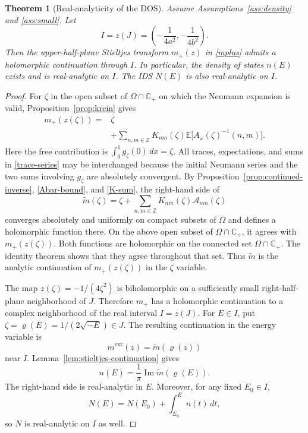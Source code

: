 \documentclass[12pt,a4paper]{article}
\numberwithin{equation}{section}
\newcommand{\E}{\mathbb E}
\newcommand{\C}{\mathbb C}
\newcommand{\Z}{\mathbb Z}
\newcommand{\cA}{\mathcal A}
\newcommand{\Om}{\Omega}
\renewcommand{\Im}{\operatorname{Im}}
\newtheorem{thm}{Theorem}
\begin{document}
\begin{thm}[Real-analyticity of the DOS]\label{thm:main}
Assume Assumptions~\ref{ass:density} and \ref{ass:small}.  Let
\begin{equation}
I=z(J)
 =\left(-\frac{1}{4a^2},-\frac{1}{4b^2}\right).
\label{energy-I}
\end{equation}
Then the upper-half-plane Stieltjes transform $m_+(z)$ in \eqref{mplus}
admits a holomorphic continuation through $I$.  In particular, the density
of states $n(E)$ exists and is real-analytic on $I$.  The IDS $N(E)$ is also
real-analytic on $I$.
\end{thm}

\begin{proof}
For $\zeta$ in the open subset of $\Om\cap\C_+$ on which the Neumann
expansion is valid, Proposition~\ref{prop:krein} gives
\begin{equation}
\begin{split}
m_+(z(\zeta))
={}&\zeta\\
&+\sum_{n,m\in\Z}K_{nm}(\zeta)
\E\bigl[A_\omega(\zeta)^{-1}(n,m)\bigr].
\end{split}
\label{trace-series}
\end{equation}
Here the free contribution is $\int_0^1g_\zeta(0)\,d x=\zeta$.
All traces, expectations, and sums in \eqref{trace-series} may be
interchanged because the initial Neumann series and the two sums involving
$g_\zeta$ are absolutely convergent.  By
Proposition~\ref{prop:continued-inverse}, \eqref{Abar-bound}, and
\eqref{K-sum}, the right-hand side of
\begin{equation}
\widetilde m(\zeta)
 =\zeta+\sum_{n,m\in\Z}K_{nm}(\zeta)\cA_{nm}(\zeta)
\label{mtilde}
\end{equation}
converges absolutely and uniformly on compact subsets of $\Om$ and defines
a holomorphic function there.  On the above open subset of
$\Om\cap\C_+$, it agrees with $m_+(z(\zeta))$.  Both functions are
holomorphic on the connected set $\Om\cap\C_+$.  The identity theorem shows
that they agree throughout that set.  Thus $\widetilde m$ is the analytic
continuation of $m_+(z(\zeta))$ in the $\zeta$ variable.

The map $z(\zeta)=-1/(4\zeta^2)$ is biholomorphic on a sufficiently small
right-half-plane neighborhood of $J$.  Therefore $m_+$ has a holomorphic
continuation to a complex neighborhood of the real interval $I=z(J)$.
For $E\in I$, put $\zeta=\varrho(E)=1/(2\sqrt{-E})\in J$.  The resulting
continuation in the energy variable is
$$
m^{\mathrm{ext}}(z)=\widetilde m(\varrho(z))
$$
near $I$.  Lemma~\ref{lem:stieltjes-continuation} gives
\begin{equation}
n(E)=\frac{1}{\pi}\Im\widetilde m(\varrho(E)).
\label{analytic-density}
\end{equation}
The right-hand side is real-analytic in $E$.  Moreover, for any fixed
$E_0\in I$,
$$
 N(E)=N(E_0)+\int_{E_0}^E n(t)\,d t,
$$
so $N$ is real-analytic on $I$ as well.
\end{proof}
\end{document}
